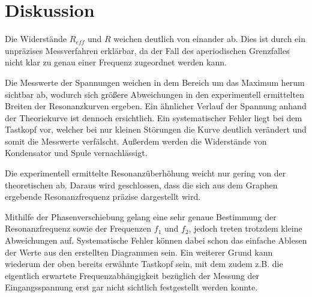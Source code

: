 \section{Diskussion}
\label{sec:Diskussion}

Die Widerstände $R_{eff}$ und $R$ weichen deutlich von einander ab. Dies ist durch ein unpräzises Messverfahren erklärbar, da
der Fall des aperiodischen Grenzfalles nicht klar zu genau einer Frequenz zugeordnet werden kann.

Die Messwerte der Spannungen weichen in dem Bereich um das Maximum herum sichtbar ab, wodurch sich größere Abweichungen
in den experimentell ermittelten Breiten der Resonanzkurven ergeben. Ein ähnlicher Verlauf der Spannung anhand
der Theoriekurve ist dennoch ersichtlich.
Ein systematischer Fehler liegt bei dem Tastkopf vor,
welcher bei nur kleinen Störungen die Kurve deutlich verändert und somit die Messwerte verfälscht. Außerdem
werden die Widerstände von Kondensator und Spule vernachlässigt.


Die experimentell ermittelte Resonanzüberhöhung weicht nur gering von der theoretischen ab. Daraus wird
geschlossen, dass die sich aus dem Graphen ergebende Resonanzfrequenz präzise dargestellt wird.

Mithilfe der Phasenverschiebung gelang eine sehr genaue Bestimmung der Resonanzfrequenz sowie der Frequenzen $f_1$ und $f_2$, jedoch treten
trotzdem kleine Abweichungen auf. Systematische
Fehler können dabei schon das einfache Ablesen der Werte aus den erstellten Diagrammen sein. Ein weiterer Grund
kann wiederum der oben bereits erwähnte Tastkopf sein, mit dem zudem z.B. die eigentlich
erwartete Frequenzabhängigkeit bezüglich der Messung der Eingangsspannung erst gar nicht
sichtlich festgestellt werden konnte.
